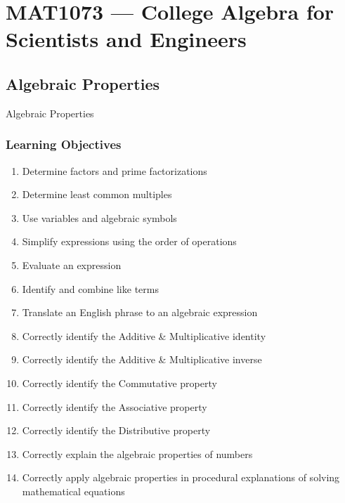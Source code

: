 \chapter{MAT1073 --- College Algebra for Scientists and Engineers}
\label{chap:unit-f995}

\ChapterWarning

\section{Algebraic Properties}
\label{sec:alge-a0fa}

Algebraic Properties

\subsection{Learning Objectives}
\label{ssec:lear-775b}

\begin{enumerate}
    \item Determine factors and prime factorizations
    \item Determine least common multiples
    \item Use variables and algebraic symbols
    \item Simplify expressions using the order of operations
    \item Evaluate an expression
    \item Identify and combine like terms
    \item Translate an English phrase to an algebraic expression
    \item Correctly identify the Additive \& Multiplicative identity
    \item Correctly identify the Additive \& Multiplicative inverse
    \item Correctly identify the Commutative property
    \item Correctly identify the Associative property
    \item Correctly identify the Distributive property
    \item Correctly explain the algebraic properties of numbers
    \item Correctly apply algebraic properties in procedural explanations of solving mathematical equations
\end{enumerate}

